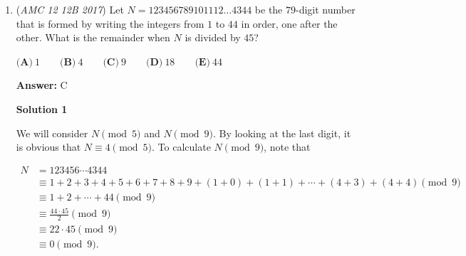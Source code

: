 \begin{enumerate}
We'll use the diagram from Solution $1$.

 Let $O$ be the center of the circle at the origin. We know that through our knowledge of Polar Coordinates, point $C$ lies on $(2\cos(\theta), 2\sin(\theta))$, where $\theta$ is defined as the measure of central angle $\angle COB$.

 Let angle $\angle EAD$ have measure $\alpha$. We can see that $\tan(\alpha) = \frac{5}{7}$, so $\sin(\alpha) = \frac{5}{\sqrt{74}}$, and $\cos(\alpha) = \frac{7}{\sqrt{74}}$.

 By the Inscribed Angle Theorem, $\theta = 2\alpha$, so the coordinates of point $C$ can be expressed as $(2\cos(2\alpha), 2\sin(2\alpha)).$ Since $O$ is at the origin, diameter $\overline{AB}$ lies on the line $y = 0$. As such, triangle $\triangle ABC$'s base is just diameter $\overline{AB}$ of length $4$, and the height is the $y$-coordinate of point $C$, or $2\sin(2\alpha)$.

 The area of triangle $\triangle ABC$ is just $\frac{1}{2} \cdot 4 \cdot 2\sin(2\alpha)$, or $4\sin(2\alpha)$.

 Using double angle identities, $\sin(2\alpha) = 2\sin(\alpha)\cos(\alpha) = \frac{2 \cdot (5 \cdot 7)}{(\sqrt{74})^2} = \frac{35}{37}$

 The area of triangle $\triangle ABC$ is $\frac{4 \cdot 35}{37} = \boxed{\textbf{(D)}~ \frac{140}{37}}$.

 


	\item (\textit{AMC 12 12B 2017}) Let $N=123456789101112\dots4344$ be the $79$-digit number that is formed by writing the integers from $1$ to $44$ in order, one after the other. What is the remainder when $N$ is divided by $45$?


 $\textbf{(A)}\ 1\qquad\textbf{(B)}\ 4\qquad\textbf{(C)}\ 9\qquad\textbf{(D)}\ 18\qquad\textbf{(E)}\ 44$

 \textbf{Answer: }C



\textbf{Solution 1}

We will consider  $N \pmod{5}$ and $N \pmod{9}$. By looking at the last digit, it is obvious that $N \equiv 4\pmod{5}$. To calculate $N \pmod{9}$, note that

 
 \begin{align*}    N &= 123456\cdots 4344 \\      &\equiv 1+2+3+4+5+6+7+8+9+(1+0)+(1+1)+\cdots+(4+3)+(4+4)  \pmod{9} \\      &\equiv 1+2+\cdots+44 \pmod{9} \\      &\equiv\frac{44\cdot 45}{2} \pmod{9}\\      &\equiv 22\cdot 45 \pmod{9} \\      &\equiv 0 \pmod{9}. \end{align*}



\end{enumerate}
